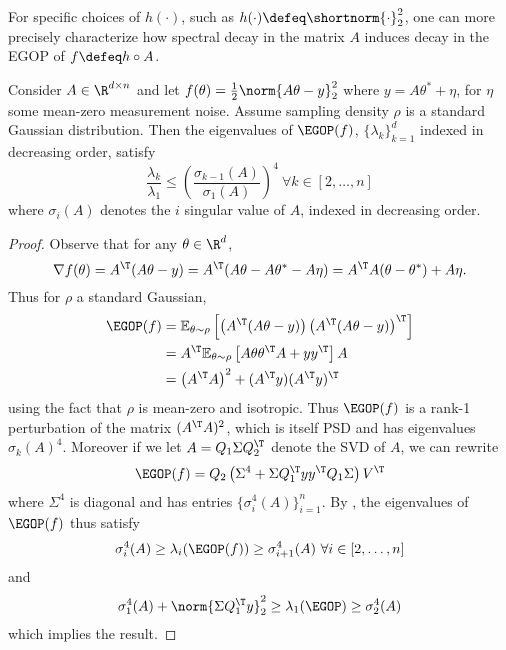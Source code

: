     For specific choices of $h(\cdot)$, such as $h(\cdot)\defeq \shortnorm{\cdot}^2_2$, one can more precisely characterize how spectral decay in the matrix $A$ induces decay in the EGOP of $f\defeq h\circ A$.
    \begin{lemma}\label{lem:spectral-decay-least-squares}
        Consider $A \in \R^{d\times n}$ and let $f(\theta) = \frac{1}{2}\norm{A\theta- y}^2_2$ where $y = A\theta^* + \eta$, for $\eta$ some mean-zero measurement noise. Assume sampling density $\rho$ is a standard Gaussian distribution. Then the eigenvalues of $\EGOP(f)$,  $\{\lambda_k\}_{k=1}^d$ indexed in decreasing order, satisfy
        \begin{equation}
            \frac{\lambda_k}{\lambda_1} \leq \left(\frac{\sigma_{k-1}(A)}{\sigma_1(A)}\right)^4 \ \forall k\in [2,\dots,n]
        \end{equation}
        where $\sigma_i(A)$ denotes the $i$ singular value of $A$, indexed in decreasing order.
    \end{lemma}
    \begin{proof}
        Observe that for any $\theta\in \R^d$,
        \[
            \nabla f(\theta) = A^{\T} (A\theta-y) = A^{\T}(A\theta - A\theta^* - A\eta) = A^{\T} A(\theta-\theta^*) + A\eta.
        \]
        Thus for $\rho$ a standard Gaussian,
        \begin{align*}
            \EGOP(f) &= \mathbb{E}_{\theta\sim \rho}\left[\left(A^{\T} (A\theta-y)\right) \left(A^{\T} (A\theta-y)\right)^{\T}\right]\\
            &=A^{\T} \mathbb{E}_{\theta\sim \rho}\left[A \theta \theta^{\T} A + yy^{\T}\right]A\\
            &=\left(A^{\T} A\right)^2 + (A^{\T}y)(A^{\T} y)^{\T}
        \end{align*}
        using the fact that $\rho$ is mean-zero and isotropic. Thus $\EGOP(f)$ is a rank-1 perturbation of the matrix $(A^{\T} A)^2$, which is itself PSD and has eigenvalues $\sigma_k(A)^4$. Moreover if we let $A = Q_1 \Sigma Q_2^\T$ denote the SVD of $A$, we can rewrite
        \[
            \EGOP(f) = Q_2\left(\Sigma^4 + \Sigma Q_1^{\T} y y^{\T} Q_1 \Sigma \right)V^{\T}
        \]
        where $\Sigma^4$ is diagonal and has entries $\{\sigma_i^4(A)\}_{i=1}^n$. By \citet{golub1973some}, the eigenvalues of $\EGOP(f)$ thus satisfy
        \[
            \sigma_i^4(A) \geq \lambda_{i}(\EGOP(f)) \geq \sigma^4_{i+1}(A) \ \forall i\in[2,\dots,n] 
        \]
        and
        \[
            \sigma_1^4(A) + \norm{\Sigma Q_1^{\T} y}^2_2 \geq \lambda_1(\EGOP)\geq \sigma^4_2(A)
        \]
        which implies the result.
    \end{proof}



